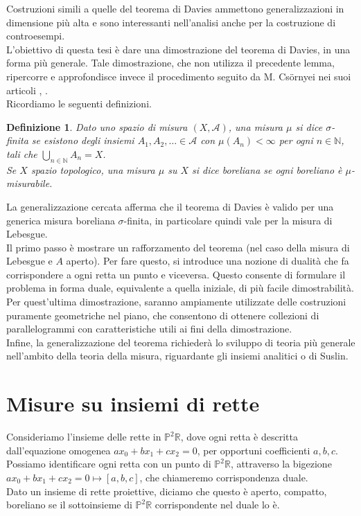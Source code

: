 \documentclass[a4paper, twoside,openright]{article}
\newcommand{\R}{\mathbb{R}}
\newcommand{\N}{\mathbb{N}}
\renewcommand{\P}{\mathbb{P}}
\newcommand{\<}{\langle}
\renewcommand{\>}{\rangle}
\newtheorem{defin}[teo]{Definizione}
\begin{document}
	Costruzioni simili a quelle del teorema di Davies ammettono generalizzazioni in dimensione più alta e sono interessanti nell’analisi anche per la costruzione di controesempi.\\
	L’obiettivo di questa tesi è dare una dimostrazione del teorema di Davies, in una forma più generale. Tale dimostrazione, che non utilizza il precedente lemma, ripercorre e approfondisce invece il procedimento seguito da M. Cs\"{o}rnyei nei suoi articoli \Cite{1}, \cite{2}.\\
	
	Ricordiamo le seguenti definizioni.
	\begin{defin}
	Dato uno spazio di misura $(X, \mathcal{A})$, una misura $\mu$ si dice $\sigma$-finita se esistono degli insiemi $A_{1},A_{2},\ldots \in {\mathcal {A}}$ con $\mu \left(A_{n}\right)<\infty $ per ogni $n \in \N$, tali che $\bigcup _{n\in \mathbb {N} }A_{n}=X$.\\
	Se $X$ spazio topologico, una misura $\mu$ su $X$ si dice boreliana se ogni boreliano è $\mu$-misurabile. \\
	\end{defin}
	La generalizzazione cercata afferma che il teorema di Davies è valido per una generica misura boreliana $\sigma$-finita, in particolare quindi vale per la misura di Lebesgue.\\
	
	Il primo passo è mostrare un rafforzamento del teorema (nel caso della misura di Lebesgue e $A$ aperto). Per fare questo, si introduce una nozione di dualità che fa corrispondere a ogni retta un punto e viceversa. Questo consente di formulare il problema in forma duale, equivalente a quella iniziale, di più facile dimostrabilità.\\
	Per quest’ultima dimostrazione, saranno ampiamente utilizzate delle costruzioni puramente geometriche nel piano, che consentono di ottenere collezioni di parallelogrammi con caratteristiche utili ai fini della dimostrazione.\\
	Infine, la generalizzazione del teorema richiederà lo sviluppo di teoria più generale nell’ambito della teoria della misura, riguardante gli insiemi analitici o di Suslin.

	\newpage


\section{Misure su insiemi di rette}
Consideriamo l'insieme delle rette in $\P^2 \R$, dove ogni retta è descritta dall'equazione omogenea $ax_0+bx_1+cx_2=0$, per opportuni coefficienti $a,b,c$.\\
Possiamo identificare ogni retta con un punto di $\P^2 \R$, attraverso la bigezione $ax_0+bx_1+cx_2=0 \mapsto [a,b,c]$, che chiameremo corrispondenza duale.\\
Dato un insieme di rette proiettive, diciamo che questo è aperto, compatto, boreliano se il sottoinsieme di $\P^2 \R$ corrispondente nel duale lo è.\\
\end{document}
